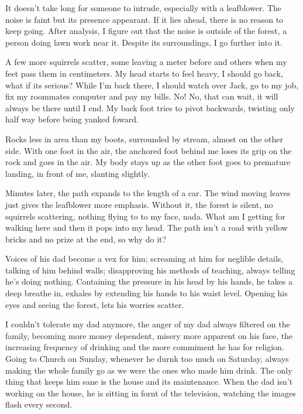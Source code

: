 \begin{docuemnt}
		It doesn't take long for someone to intrude, especially with a leafblower. The noise is faint but its presence appearant. If it lies ahead, there is
	no reason to keep going. After analysis, I figure out that the noise is outside of the forest, a person doing lawn work near it. Despite its surroundings, I
	go further into it.

		A few more squirrels scatter, some leaving a meter before and others when my feet pass them in centimeters. My head starts to feel heavy, I should go
	back, what if its serious? While I'm back there, I should watch over Jack, go to my job, fix my roommates computer and pay my bills. No! No, that can wait,
	it will always be there until I end. My back foot tries to pivot backwards, twisting only half way before being yanked foward.

		Rocks less in area than my boots, surrounded by stream, almost on the other side. With one foot in the air, the anchored foot behind me loses its grip
	on the rock and goes in the air. My body stays up as the other foot goes to premature landing, in front of me, slanting slightly.

		Minutes later, the path expands to the length of a car. The wind moving leaves just gives the leafblower more emphasis. Without it, the forest is
	silent, no squirrels scattering, nothing flying to to my face, nada. What am I getting for walking here and then it pops into my head. The path isn't a road
	with yellow bricks and no prize at the end, so why do it?

		Voices of his dad become a vex for him; screaming at him for neglible details, talking of him behind walls; disapproving his methods of teaching,
	always telling he's doing nothing. Containing the pressure in his head by his hands, he takes a deep breathe in, exhales by extending his hands to his waist
	level. Opening his eyes and seeing the forest, lets his worries scatter.

		I couldn't tolerate my dad anymore, the anger of my dad always filtered on the family, becoming more money dependent, misery more apparent on his face,
	the increasing frequency of drinking and the more commiment he has for religion. Going to Church on Sunday, whenever he durnk too much on Saturday, always
	making the whole family go as we were the ones who made him drink. The only thing that keeps him sane is the house and its maintenance. When the dad isn't
	working on the house, he is sitting in fornt of the television, watching the images flash every second.


\end{docuemnt}
